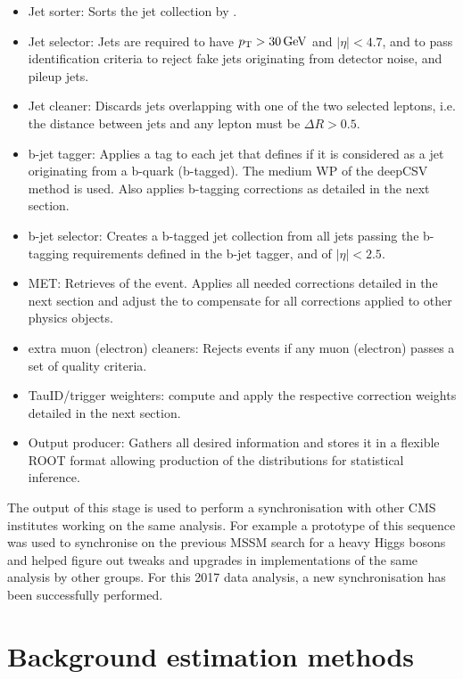 \begin{itemize}
    \item Jet sorter: Sorts the jet collection by \pt.
    \item Jet selector: Jets are required to have $p_{\mathrm{T}} > 30\,\mathrm{GeV}$ and $|\eta| < 4.7$, and to pass identification criteria to reject fake jets originating from detector noise, and pileup jets.
    \item Jet cleaner: Discards jets overlapping with one of the two selected leptons, i.e. the distance between jets and any lepton must be $\Delta R > 0.5$.
    \item b-jet tagger: Applies a tag to each jet that defines if it is considered as a jet originating from a b-quark (b-tagged). The medium WP of the deepCSV method \cite{Sirunyan_2018} is used. Also applies b-tagging corrections as detailed in the next section.
    \item b-jet selector: Creates a b-tagged jet collection from all jets passing the b-tagging requirements defined in the b-jet tagger, and of $|\eta|<2.5$.
    \item MET: Retrieves \MET of the event. Applies all needed corrections detailed in the next section and adjust the \MET to compensate for all corrections applied to other physics objects.
    \item extra muon (electron) cleaners: Rejects events if any muon (electron) passes a set of quality criteria.
    \item TauID/trigger weighters: compute and apply the respective correction weights detailed in the next section.
    \item Output producer: Gathers all desired information and stores it in a flexible ROOT format allowing production of the distributions for statistical inference.
\end{itemize}

The output of this stage is used to perform a synchronisation with other CMS institutes working on the same analysis. For example a prototype of this sequence was used to synchronise on the previous MSSM search for a heavy Higgs bosons \cite{Aaboud2018} and helped figure out tweaks and upgrades in implementations of the same analysis by other groups. For this 2017 data analysis, a new synchronisation has been successfully performed.


\section{Background estimation methods}
\label{sec:analysis_background_methods}


